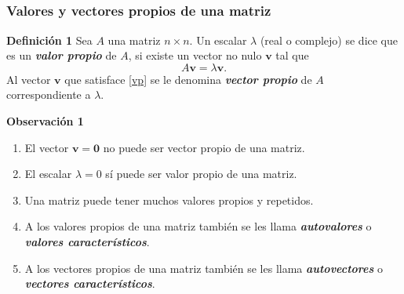 
\subsection{}

{\nologo 
\begin{frame}\frametitle{Valores y vectores propios de una matriz}

\begin{defi}{\textbf{Definición 1}}\justifying
	\justifying
	Sea $A$ una matriz $n\times n$. Un escalar $\lambda$ (real o complejo) se dice que es un \textbf{\textit{valor propio}}
	de $A$, si existe un vector no nulo $\mathbf{v}$ tal que
	\begin{equation}\tag{1}%
	A \mathbf{v} = \lambda \mathbf{v}.
	\end{equation}
	Al vector $\mathbf{v}$ que satisface \eqref{vp} se le denomina \textbf{\textit{vector propio}} de $A$ correspondiente a $\lambda$.
\end{defi}	

\begin{alertblock}{\textbf{Observación 1}}
	\begin{enumerate}[$a$]\justifying
		\item El vector $\mathbf{v}=\mathbf{0}$ no puede ser vector propio de una matriz. \\[2mm]
		\item El escalar $\lambda = 0$ sí puede ser valor propio de una matriz. \\[2mm]
		\item Una matriz puede tener muchos valores propios y repetidos.
		\item A los valores propios de una matriz también se les llama \textbf{\textit{autovalores}}
		o \textbf{\textit{valores característicos}}.
		\item A los vectores propios de una matriz también se les llama \textbf{\textit{autovectores}}
		o \textbf{\textit{vectores característicos}}.
	\end{enumerate}
\end{alertblock}

\end{frame}
}


\subsection{}


